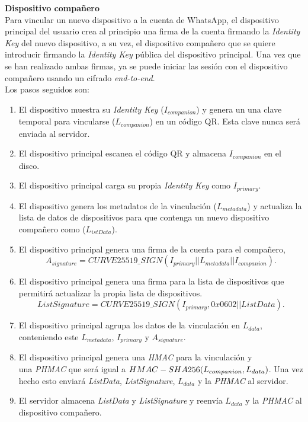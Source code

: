 \begin{description}
	\item \textbf{Dispositivo compañero}\\
	Para vincular un nuevo dispositivo a la cuenta de WhatsApp, el dispositivo principal del usuario crea al principio una firma de la cuenta firmando la \emph{Identity Key} del nuevo dispositivo, a su vez, el dispositivo compañero que se quiere introducir firmando la \emph{Identity Key} pública del dispositivo principal. Una vez que se han realizado ambas firmas, ya se puede iniciar las sesión con el dispositivo compañero usando un cifrado \emph{end-to-end}.\\Los pasos seguidos son:
	\begin{enumerate}
		\item El dispositivo muestra su \emph{Identity Key} ($I_{companion}$) y genera un una clave temporal para vincularse ($L_{companion}$) en un código QR. Esta clave nunca será enviada al servidor.
		\item El dispositivo principal escanea el código QR y almacena $I_{companion}$ en el disco.
		\item El dispositivo principal carga su propia \emph{Identity Key} como $I_{primary}$.
		\item El dispositivo genera los metadatos de la vinculación ($L_{metadata}$) y actualiza la lista de datos de dispositivos para que contenga un nuevo dispositivo compañero como ($L_{istData}$).
		\item El dispositivo principal genera una firma de la cuenta para el compañero, $$A_{signature}=CURVE25519\_SIGN(I_{primary} || L_{metadata} || I_{companion}).$$
		\item El dispositivo principal genera una firma para la lista de dispositivos que permitirá actualizar la propia lista de dispositivos. $$ListSignature = CURVE25519\_SIGN(I_{primary}, 0x0602 || ListData).$$
		\item El dispositivo principal agrupa los datos de la vinculación en $L_{data}$, conteniendo este $L_{metadata}$, $I_{primary}$ y $A_{signature}$.
		\item El dispositivo principal genera una \emph{HMAC} para la vinculación y\\ una \emph{PHMAC} que será igual a $HMAC-SHA256(L_{companion}\\, L_{data})$. Una vez hecho esto enviará \emph{ListData}, \emph{ListSignature}, $L_{data}$ y la \emph{PHMAC} al servidor.
		\item El servidor almacena \emph{ListData} y \emph{ListSignature} y reenvía $L_{data}$ y la \emph{PHMAC} al dispositivo compañero.

\end{enumerate}
\end{description}
